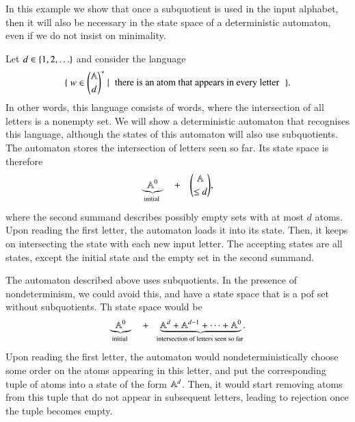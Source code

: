 \begin{myexample} In this example we show that once a subquotient is used in the input alphabet, then it will also be necessary in the state space of a deterministic automaton, even if we do not insist on minimality. 
    
    Let $d \in \{1,2,\ldots\}$ and  consider the language 
    \begin{align*}
    \setbuild { w \in {\atoms \choose d}^*}{there is an atom that appears in every letter}.
    \end{align*}
    In other words, this language consists of words, where the intersection of all letters is a nonempty set. We will show a deterministic automaton that recognises this language, although the states of this automaton will also use subquotients. The automaton stores the intersection of letters seen so far. Its state space is therefore 
    \begin{align*}
    \myunderbrace{\atoms^0}{initial}
    \quad + \quad 
    {\atoms \choose {\leq d}},
    \end{align*}
    where the second summand describes possibly empty sets with at most $d$ atoms. Upon reading the first letter, the automaton loads it into its state. Then, it keeps on intersecting the state with each new input letter. The accepting states are all states, except the initial state and the empty set in the second summand.

    The automaton described above uses subquotients. In the presence of nondeterminism, we could avoid this, and have a state space that is a pof set without subquotients. Th state space would be 
    \begin{align*}
    \myunderbrace{\atoms^0}{initial}
    \quad + \quad 
    \myunderbrace{
        \atoms^d + \atoms^{d-1} + \cdots + \atoms^0}
    {intersection of letters seen so far}.
    \end{align*}
    Upon reading the first letter, the automaton would nondeterministically choose some order on the atoms appearing in this letter, and put the corresponding tuple of atoms into a state of the form $\mathbb A^d$. Then, it would start removing atoms from this tuple that do not appear in subsequent letters, leading to rejection once the tuple becomes empty. 


\end{myexample}

